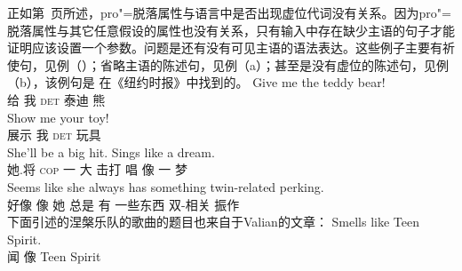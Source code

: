 正如第~\pageref{fn-Expletiva-Pro-Drop}页所述，pro"=脱落属性与语言中是否出现虚位代词没有关系。因为pro"=脱落属性与其它任意假设的属性也没有关系，只有输入中存在缺少主语的句子才能证明应该设置一个参数。问题是还有没有可见主语的语法表达。这些例子主要有祈使句，见例（）；省略主语的陈述句，见例（a）；甚至是没有虚位的陈述句，见例（b），该例句是 \citet[]{Valian91a}在《纽约时报》中找到的。
\eal
\label{Beispiel-Imperativ-Englisch}
\ex 
\gll Give me the teddy bear!\\  
    给 我 \textsc{det} 泰迪 熊\\
\ex 
\gll Show me your toy!\\  
    展示 我 \textsc{det} 玩具\\
\zl
\eal
\ex\label{ex-sings-like-a-dream} 
\gll She'll be a big hit. Sings like a dream.\\
    她.将 \textsc{cop} 一 大 击打 唱 像 一 梦\\
\ex 
\gll Seems like she always has something twin-related perking.\\  
    好像 像 她 总是 有 一些东西 双-相关  振作\\
\zl
下面引述的涅槃乐队的歌曲的题目也来自于Valian的文章：
\ea
\gll Smells like Teen Spirit.\\  
    闻 像 Teen Spirit\\
